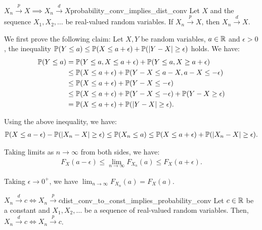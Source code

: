 \begin{proposition}{$X_n\xrightarrow{p}X\implies X_n\xrightarrow{d}X$}{probability_conv_implies_dist_conv}
    Let $X$ and the sequence $X_1, X_2, \dots$ be real-valued random variables. If $X_n\xrightarrow{p}X$, then $X_n\xrightarrow{d}X$.
\end{proposition}

\begin{proof*}
    We first prove the following claim: Let $X, Y$ be random variables, $a\in\mathbb{R}$ and $\epsilon>0$, the inequality $\mathbb{P}(Y\le a) \le \mathbb{P}(X \le a + \epsilon) + \mathbb{P}(|Y-X|\ge\epsilon)$ holds. We have:
    \begin{align*}
        \mathbb{P}(Y\le a) &= \mathbb{P}(Y\le a, X \le a + \epsilon) + \mathbb{P}(Y \le a, X \ge a + \epsilon) \\
            &\le \mathbb{P}(X \le a + \epsilon) + \mathbb{P}(Y - X\le a - X, a - X \le -\epsilon) \\
            &\le \mathbb{P}(X \le a + \epsilon) + \mathbb{P}(Y - X \le -\epsilon) \\
            &\le \mathbb{P}(X \le a + \epsilon) + \mathbb{P}(Y - X \le -\epsilon) + \mathbb{P}(Y - X \ge \epsilon) \\
            &= \mathbb{P}(X \le a + \epsilon) + \mathbb{P}(|Y - X| \ge \epsilon).
    \end{align*}

    \noindent Using the above inequality, we have:
    \begin{align*}
        \mathbb{P}(X \le a - \epsilon) - \mathbb{P}(|X_n - X| \ge \epsilon) \le \mathbb{P}(X_n \le a) \le \mathbb{P}(X\le a + \epsilon) + \mathbb{P}(|X_n - X| \ge \epsilon).
    \end{align*}

    \noindent Taking limits as $n\to\infty$ from both sides, we have:
    \begin{align*}
        F_X(a - \epsilon) \le \lim_{n\to\infty} F_{X_n}(a) \le F_X(a + \epsilon).
    \end{align*}

    \noindent Taking $\epsilon \to 0^+$, we have $\lim_{n\to\infty} F_{X_n}(a) = F_X(a)$.
\end{proof*}

\begin{proposition}{$X_n\xrightarrow{d}c\iff X_n\xrightarrow{p}c$}{dist_conv_to_const_implies_probability_conv}
    Let $c\in\mathbb{R}$ be a constant and $X_1, X_2, \dots$ be a sequence of real-valued random variables. Then, $X_n\xrightarrow{d}c\iff X_n\xrightarrow{p}c$.
\end{proposition}

